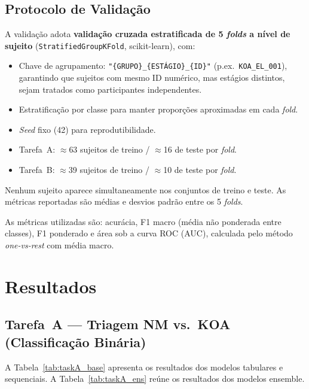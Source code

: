 \documentclass[a4paper,12pt]{article}
\begin{document}
\subsection{Protocolo de Validação}

A validação adota \textbf{validação cruzada estratificada de 5 \textit{folds} a nível
de sujeito} (\texttt{StratifiedGroupKFold}, scikit-learn), com:

\begin{itemize}
  \item Chave de agrupamento: \texttt{"\{GRUPO\}\_\{ESTÁGIO\}\_\{ID\}"}
        (p.ex.\ \texttt{KOA\_EL\_001}), garantindo que sujeitos com mesmo ID
        numérico, mas estágios distintos, sejam tratados como participantes
        independentes.
  \item Estratificação por classe para manter proporções aproximadas em cada
        \textit{fold}.
  \item \textit{Seed} fixo (42) para reprodutibilidade.
  \item Tarefa~A: $\approx$63 sujeitos de treino / $\approx$16 de teste por
        \textit{fold}.
  \item Tarefa~B: $\approx$39 sujeitos de treino / $\approx$10 de teste por
        \textit{fold}.
\end{itemize}

Nenhum sujeito aparece simultaneamente nos conjuntos de treino e teste. As métricas
reportadas são médias e desvios padrão entre os 5 \textit{folds}.

As métricas utilizadas são: acurácia, F1 macro (média não ponderada entre classes),
F1 ponderado e área sob a curva ROC (AUC), calculada pelo método
\textit{one-vs-rest} com média macro.

\section{Resultados}

\subsection{Tarefa~A --- Triagem NM vs.\ KOA (Classificação Binária)}

A Tabela~\ref{tab:taskA_base} apresenta os resultados dos modelos tabulares e
sequenciais. A Tabela~\ref{tab:taskA_ens} reúne os resultados dos modelos ensemble.
\end{document}
